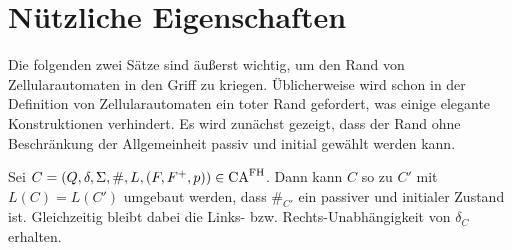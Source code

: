 \section{Nützliche Eigenschaften}

Die folgenden zwei Sätze sind äußerst wichtig, um den Rand von Zellularautomaten in den Griff zu kriegen.
Üblicherweise wird schon in der Definition von Zellularautomaten ein toter Rand gefordert, was einige elegante Konstruktionen verhindert.
Es wird zunächst gezeigt, dass der Rand ohne Beschränkung der Allgemeinheit passiv und initial gewählt werden kann.

\begin{satz}
    Sei $C = (Q, \delta, \Sigma, \#, L, (F, F^+, p)) \in \textrm{CA}^{\textrm{FH}}$.
    Dann kann $C$ so zu $C'$ mit $L(C) = L(C')$ umgebaut werden, dass $\#_{C'}$ ein passiver und initialer Zustand ist.
    Gleichzeitig bleibt dabei die Links- \acs{bzw.} Rechts-Unabhängigkeit von $\delta_C$ erhalten.
\end{satz}
